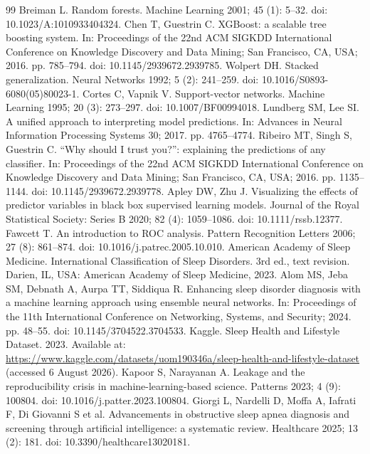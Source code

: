 \documentclass{elektr}
\begin{document}
\begin{thebibliography}{99}
 Breiman L. Random forests. Machine Learning 2001; 45 (1): 5--32. doi: 10.1023/A:1010933404324.
 Chen T, Guestrin C. XGBoost: a scalable tree boosting system. In: Proceedings of the 22nd ACM SIGKDD International Conference on Knowledge Discovery and Data Mining; San Francisco, CA, USA; 2016. pp. 785--794. doi: 10.1145/2939672.2939785.
 Wolpert DH. Stacked generalization. Neural Networks 1992; 5 (2): 241--259. doi: 10.1016/S0893-6080(05)80023-1.
 Cortes C, Vapnik V. Support-vector networks. Machine Learning 1995; 20 (3): 273--297. doi: 10.1007/BF00994018.
 Lundberg SM, Lee SI. A unified approach to interpreting model predictions. In: Advances in Neural Information Processing Systems 30; 2017. pp. 4765--4774.
 Ribeiro MT, Singh S, Guestrin C. ``Why should I trust you?'': explaining the predictions of any classifier. In: Proceedings of the 22nd ACM SIGKDD International Conference on Knowledge Discovery and Data Mining; San Francisco, CA, USA; 2016. pp. 1135--1144. doi: 10.1145/2939672.2939778.
 Apley DW, Zhu J. Visualizing the effects of predictor variables in black box supervised learning models. Journal of the Royal Statistical Society: Series B 2020; 82 (4): 1059--1086. doi: 10.1111/rssb.12377.
 Fawcett T. An introduction to ROC analysis. Pattern Recognition Letters 2006; 27 (8): 861--874. doi: 10.1016/\allowbreak j.patrec.2005.10.010.
 American Academy of Sleep Medicine. International Classification of Sleep Disorders. 3rd ed., text revision. Darien, IL, USA: American Academy of Sleep Medicine, 2023.
 Alom MS, Jeba SM, Debnath A, Aurpa TT, Siddiqua R. Enhancing sleep disorder diagnosis with a machine learning approach using ensemble neural networks. In: Proceedings of the 11th International Conference on Networking, Systems, and Security; 2024. pp. 48--55. doi: 10.1145/3704522.3704533.
 Kaggle. Sleep Health and Lifestyle Dataset. 2023. Available at: \url{https://www.kaggle.com/datasets/uom190346a/sleep-health-and-lifestyle-dataset} (accessed 6 August 2026).
 Kapoor S, Narayanan A. Leakage and the reproducibility crisis in machine-learning-based science. Patterns 2023; 4 (9): 100804. doi: 10.1016/j.patter.2023.100804.
 Giorgi L, Nardelli D, Moffa A, Iafrati F, Di Giovanni S et al. Advancements in obstructive sleep apnea diagnosis and screening through artificial intelligence: a systematic review. Healthcare 2025; 13 (2): 181. doi: 10.3390/healthcare13020181.

\end{thebibliography}
\end{document}
